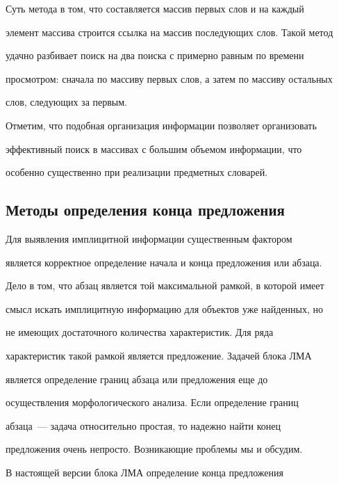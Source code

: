    Суть метода в том, что составляется массив первых слов и на каждый 


элемент массива строится ссылка на массив последующих слов. Такой метод 


удачно разбивает поиск на два поиска с примерно равным по времени 


просмотром: сначала по массиву первых слов, а затем по массиву остальных 


слов, следующих за первым. 


   


   Отметим, что подобная организация информации позволяет организовать 


эффективный поиск в массивах с  большим объемом информации, что 


особенно существенно при реализации предметных словарей.


   


   \subsection{Методы определения конца предложения}


   


   Для выявления имплицитной информации существенным фактором 


является корректное определение начала и конца предложения или абзаца. 


Дело в том, что абзац является той максимальной рамкой, в которой имеет 


смысл искать имплицитную информацию для объектов уже найденных, но 


не имеющих достаточного количества характеристик. Для ряда 


характеристик такой рамкой является предложение. Задачей блока ЛМА 


является  определение границ абзаца или предложения еще до 


осуществления морфологического анализа. Если определение границ 


абзаца~--- задача относительно простая, то надежно найти конец 


предложения очень непросто. Возникающие проблемы мы и обсудим.


   


   В настоящей версии блока ЛМА определение конца предложения 


